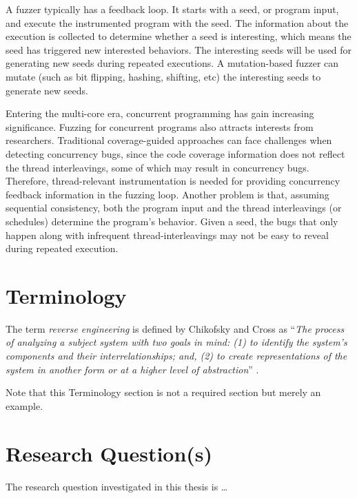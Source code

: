 A fuzzer typically has a feedback loop. It starts with a seed, or program input, and execute the instrumented program with the seed. The information about the execution is collected to determine whether a seed is interesting, which means the seed has triggered new interested behaviors. The interesting seeds will be used for generating new seeds during repeated executions. A mutation-based fuzzer can mutate (such as bit flipping, hashing, shifting, etc) the interesting seeds to generate new seeds. 


Entering the multi-core era, concurrent programming has gain increasing significance. Fuzzing for concurrent programs also attracts interests from researchers. Traditional coverage-guided approaches can face challenges when detecting concurrency bugs, since the code coverage information does not reflect the thread interleavings, some of which may result in concurrency bugs. Therefore, thread-relevant instrumentation is needed for providing concurrency feedback information in the fuzzing loop. Another problem is that, assuming sequential consistency, both the program input and the thread interleavings (or schedules) determine the program's behavior. Given a seed, the bugs that only happen along with infrequent thread-interleavings may not be easy to reveal during repeated execution. 

















\section{Terminology}

The term \emph{reverse engineering} is defined by Chikofsky and Cross as 
``\emph{The process of analyzing a subject system with two goals in mind: 
(1) to identify the system's components and their interrelationships; and,
(2) to create representations of the system in another form or at a higher 
level of abstraction}'' \cite{c11tester}.

Note that this Terminology section is not a required section but 
merely an example.

\section{Research Question(s)}

The research question investigated in this thesis is \ldots


